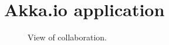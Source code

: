 \section{Akka.io application}
\label{sec:akka-app}


\begin{figure}[h]
	\centering
	\caption{View of collaboration.}
	\label{fig:screen-collaboration}
\end{figure}
